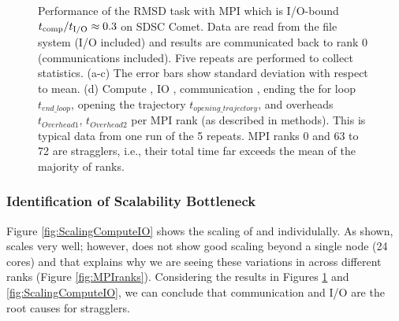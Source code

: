 \begin{figure}[ht!]
\caption{Performance of the RMSD task with MPI which is I/O-bound ${t}_{\text{comp}}/{t}_{\text{I/O}} \approx 0.3$ on SDSC Comet.
Data are read from the file system (I/O included) and results are communicated back to
rank 0 (communications included). Five repeats are performed to collect statistics. (a-c) The error bars show
standard deviation with respect to mean. (d) Compute \tcomp, IO \tIO, communication \tcomm, ending the for loop $t_{end\_loop}$,
opening the trajectory $t_{opening\_trajectory}$, and overheads $t_{Overhead1}$,  $t_{Overhead2}$ per MPI rank (as described in methods).
This is typical data from one run of the 5 repeats. MPI ranks 0 and 63 to 72 are stragglers, i.e., their total time 
far exceeds the mean of the majority of ranks.}
  
\label{fig:MPIwithIO}
\end{figure} 

\subsubsection*{Identification of Scalability Bottleneck}

Figure \ref{fig:ScalingComputeIO} shows the scaling of \tcomp and \tIO individulally. 
As shown, \tcomp scales very well; however, \tIO does not show good scaling beyond a single node (24 cores) and that explains why we are seeing these variations in \tIO across different ranks (Figure \ref{fig:MPIranks}). 
Considering the results in Figures \ref{fig:MPIwithIO} and \ref{fig:ScalingComputeIO}, we can conclude that communication and I/O are the root causes for stragglers. 

